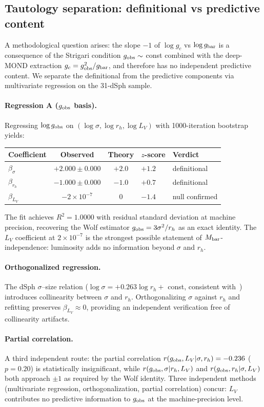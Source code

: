 \documentclass[11pt,a4paper]{article}
\newcommand{\e}[1]{\times 10^{#1}}
\newcommand{\gobs}{g_{\rm obs}}
\newcommand{\gbar}{g_{\rm bar}}
\newcommand{\gc}{g_{c}}
\newcommand{\rh}{r_{h}}
\newcommand{\LV}{L_{V}}
\newcommand{\Mbar}{M_{\rm bar}}
\begin{document}
\subsection{Tautology separation: definitional vs predictive content}
A methodological question arises: the slope $-1$ of $\log\gc$ vs $\log\gbar$ is a consequence of the
Strigari condition $\gobs \sim$ const combined with the deep-MOND extraction $\gc = \gobs^2/\gbar$, and
therefore has no independent predictive content. We separate the definitional from the predictive components
via multivariate regression on the 31-dSph sample.

\paragraph{Regression A ($\gobs$ basis).}
Regressing $\log\gobs$ on $(\log\sigma, \log\rh, \log\LV)$ with 1000-iteration bootstrap yields:
\begin{center}\small
\begin{tabular}{@{}lccll@{}}
\toprule
Coefficient & Observed & Theory & $z$-score & Verdict \\
\midrule
$\beta_\sigma$ & $+2.000 \pm 0.000$ & $+2.0$ & $+1.2$ & definitional \\
$\beta_{\rh}$ & $-1.000 \pm 0.000$ & $-1.0$ & $+0.7$ & definitional \\
$\beta_{\LV}$ & $-2\e{-7}$ & $0$ & $-1.4$ & null confirmed \\
\bottomrule
\end{tabular}
\end{center}

The fit achieves $R^2 = 1.0000$ with residual standard deviation at machine precision, recovering the Wolf
estimator $\gobs = 3\sigma^2/\rh$ as an exact identity. The $\LV$ coefficient at $2\e{-7}$ is the strongest
possible statement of $\Mbar$-independence: luminosity adds no information beyond $\sigma$ and $\rh$.

\paragraph{Orthogonalized regression.}
The dSph $\sigma$--size relation ($\log\sigma = +0.263\log\rh + $ const, consistent
with~\citealt{McConnachie2012}) introduces collinearity between $\sigma$ and $\rh$. Orthogonalizing $\sigma$
against $\rh$ and refitting preserves $\beta_{\LV} \approx 0$, providing an independent verification free of
collinearity artifacts.

\paragraph{Partial correlation.}
A third independent route: the partial correlation $r(\gobs, \LV | \sigma, \rh) = -0.236$ ($p = 0.20$) is
statistically insignificant, while $r(\gobs, \sigma | \rh, \LV)$ and $r(\gobs, \rh | \sigma, \LV)$ both
approach $\pm 1$ as required by the Wolf identity. Three independent methods (multivariate regression,
orthogonalization, partial correlation) concur: $\LV$ contributes no predictive information to $\gobs$ at
the machine-precision level.
\end{document}
